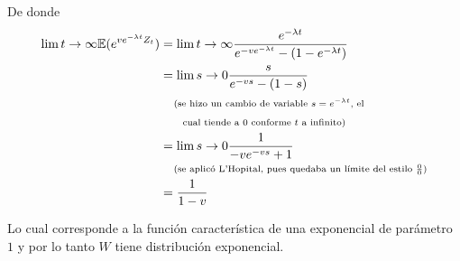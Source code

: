 De donde
\begin{align}
    \lim{t \rightarrow \infty}   \mathbb{E}(e^{v e^{-\lambda t} Z_t})   &= \lim{t \rightarrow \infty}  \frac{e^{-\lambda t}}{e^{-v e^{-\lambda t}}-(1-e^{-\lambda t})}  \\
                                                                &= \lim{s \rightarrow 0}  \frac{s}{e^{-v s}-(1-s)}                                              \\                                                                         
                                                                &\;\;\;\;\mbox{{\scriptsize(se hizo un cambio de variable $s = e^{-\lambda t}$, el}}                              \\
                                                                &\;\;\;\;\mbox{{\scriptsize\;\; cual tiende a 0 conforme $t$ a infinito)}}                                            \\
                                                                &= \lim{s \rightarrow 0}  \frac{1}{-v e^{-v s}+1}                                               \\                                                                          
                                                                &\;\;\;\;\mbox{{\scriptsize(se aplicó L'Hopital, pues quedaba un límite del estilo $\frac{0}{0}$)}}                 \\
                                                                &= \frac{1}{1-v}                                                                                \\                                                                          
\end{align}

Lo cual corresponde a la función característica de una exponencial de parámetro $1$ y por lo tanto $W$ tiene distribución exponencial.